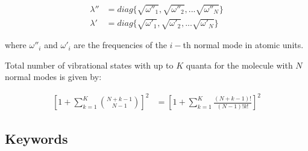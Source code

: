 \documentclass[11pt]{article}
\begin{document}
\begin{align}
\lambda''&=diag\{\sqrt{\omega''_1},\sqrt{\omega''_2},... \sqrt{\omega''_N}\}\nonumber\\
\lambda'&=diag\{\sqrt{\omega'_1},\sqrt{\omega'_2},... \sqrt{\omega'_N}\}\nonumber
\end{align}


where $\omega''_i$ and $\omega'_i$ are the frequencies of the $i-$th normal mode in atomic units.


Total number of vibrational states with up to $K$ quanta for the molecule with $N$ normal modes is
given by\cite{stars_and_bars}:

\begin{align}
\left[ 1+\sum_{k=1}^{K} {{N+k-1}\choose{N-1}} \right]^2&=\left[ 1+\sum_{k=1}^{K}\frac{(N+k-1)!}{(N-1)!k!} \right]^2
\end{align}



\subsection{Keywords}
\label{sec:dhush:keywords}
\end{document}
